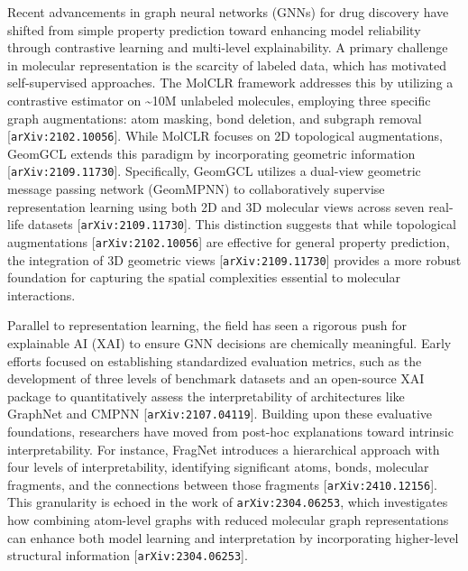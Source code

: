\documentclass[11pt]{article}
\begin{document}
Recent advancements in graph neural networks (GNNs) for drug discovery have shifted from simple property prediction toward enhancing model reliability through contrastive learning and multi-level explainability. A primary challenge in molecular representation is the scarcity of labeled data, which has motivated self-supervised approaches. The MolCLR framework addresses this by utilizing a contrastive estimator on \textasciitilde{}10M unlabeled molecules, employing three specific graph augmentations: atom masking, bond deletion, and subgraph removal [\texttt{arXiv:2102.10056}]. While MolCLR focuses on 2D topological augmentations, GeomGCL extends this paradigm by incorporating geometric information [\texttt{arXiv:2109.11730}]. Specifically, GeomGCL utilizes a dual-view geometric message passing network (GeomMPNN) to collaboratively supervise representation learning using both 2D and 3D molecular views across seven real-life datasets [\texttt{arXiv:2109.11730}]. This distinction suggests that while topological augmentations [\texttt{arXiv:2102.10056}] are effective for general property prediction, the integration of 3D geometric views [\texttt{arXiv:2109.11730}] provides a more robust foundation for capturing the spatial complexities essential to molecular interactions.

Parallel to representation learning, the field has seen a rigorous push for explainable AI (XAI) to ensure GNN decisions are chemically meaningful. Early efforts focused on establishing standardized evaluation metrics, such as the development of three levels of benchmark datasets and an open-source XAI package to quantitatively assess the interpretability of architectures like GraphNet and CMPNN [\texttt{arXiv:2107.04119}]. Building upon these evaluative foundations, researchers have moved from post-hoc explanations toward intrinsic interpretability. For instance, FragNet introduces a hierarchical approach with four levels of interpretability, identifying significant atoms, bonds, molecular fragments, and the connections between those fragments [\texttt{arXiv:2410.12156}]. This granularity is echoed in the work of \texttt{arXiv:2304.06253}, which investigates how combining atom-level graphs with reduced molecular graph representations can enhance both model learning and interpretation by incorporating higher-level structural information [\texttt{arXiv:2304.06253}].
\end{document}
